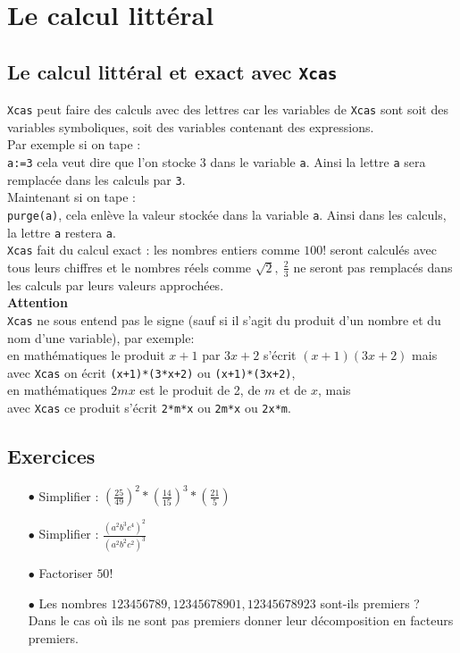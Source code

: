 \documentclass[a4paper,11pt]{book}
\begin{document}
\chapter{Le calcul litt\'eral}
\section{Le calcul litt\'eral et exact avec {\tt Xcas}}\index{:=}
{\tt Xcas} peut faire des calculs avec des lettres car les variables de 
{\tt Xcas} sont soit des variables symboliques, soit des variables contenant 
des expressions.\\
 Par exemple si on tape :\\
{\tt a:=3} cela veut dire que l'on stocke 3 dans le variable {\tt a}. Ainsi
la lettre {\tt a} sera remplac\'ee dans les calculs par {\tt 3}. \\
Maintenant si on tape :\\
{\tt purge(a)}, cela enl\`eve la valeur stock\'ee dans la variable {\tt a}. 
Ainsi dans les calculs, la lettre {\tt a} restera {\tt a}.\\
{\tt Xcas} fait du calcul exact : les nombres entiers comme $ 100!$ seront 
calcul\'es avec tous leurs chiffres et le nombres r\'eels comme 
$\sqrt 2,\ \frac{2}{3}$ ne seront pas remplac\'es dans les calculs par leurs 
valeurs approch\'ees. \\
{\bf Attention} \\
{\tt Xcas} ne sous entend pas le signe {\tt *} (sauf si il 
s'agit du produit d'un nombre et du nom d'une variable), par exemple:\\
en math\'ematiques le produit $x+1$ par $3x+2$ s'\'ecrit
$(x+1)(3x+2)$ mais \\
avec {\tt Xcas} on \'ecrit
{\tt (x+1)*(3*x+2)} ou {\tt (x+1)*(3x+2)},\\
en math\'ematiques $2mx$ est le produit de 2, de $m$ et de $x$, mais \\
avec {\tt Xcas} ce produit s'\'ecrit
{\tt 2*m*x} ou {\tt 2m*x} ou {\tt 2x*m}.
\section{Exercices}
\begin{enumerate}
\item[$\bullet$]Simplifier :
$\displaystyle {(\frac{25}{49})}^2*{(\frac{14}{15})}^3*(\frac{21}{5})$
\item[$\bullet$]Simplifier :
$\displaystyle \frac{(a^2b^3c^4)^2}{(a^2b^2c^2)^3}$
\item[$\bullet$] Factoriser $50!$
\item[$\bullet$] Les nombres $123456789,12345678901,12345678923 $ sont-ils 
premiers ? \\
Dans le cas o\`u ils ne sont pas premiers donner leur d\'ecomposition en 
facteurs premiers.
\end{enumerate}
\end{document}
